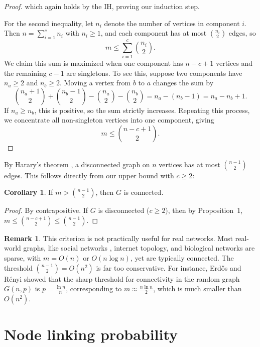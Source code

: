 \documentclass[12pt]{article}
\theoremstyle{definition}
\newtheorem{corollary}[theorem]{Corollary}
\newtheorem{remark}[theorem]{Remark}
\begin{document}
\begin{proof}
  \noindent
  which again holds by the IH, proving our induction step.

  For the second inequality, let $n_i$ denote the number of vertices in component $i$. Then $n = \sum_{i=1}^{c} n_i$ with $n_i \geq 1$, and each component has at most $\binom{n_i}{2}$ edges, so
  \[
    m \leq \sum_{i=1}^{c} \binom{n_i}{2}.
  \]
  We claim this sum is maximized when one component has $n - c + 1$ vertices and the remaining $c - 1$ are singletons. To see this, suppose two components have $n_a \geq 2$ and $n_b \geq 2$. Moving a vertex from $b$ to $a$ changes the sum by
  \[
    \binom{n_a + 1}{2} + \binom{n_b - 1}{2} - \binom{n_a}{2} - \binom{n_b}{2} = n_a - (n_b - 1) = n_a - n_b + 1.
  \]
  If $n_a \geq n_b$, this is positive, so the sum strictly increases. Repeating this process, we concentrate all non-singleton vertices into one component, giving
  \[
    m \leq \binom{n - c + 1}{2}.
  \]

\end{proof}

\noindent
By Harary's theorem \cite{harary1969graph}, a disconnected graph on $n$ vertices has at most $\binom{n-1}{2}$ edges. This follows directly from our upper bound with $c \geq 2$:

\begin{corollary}
  If $m > \binom{n-1}{2}$, then $G$ is connected.
\end{corollary}

\begin{proof}
  By contrapositive. If $G$ is disconnected ($c \geq 2$), then by Proposition~1,
  $m \leq \binom{n - c + 1}{2} \leq \binom{n-1}{2}$.
\end{proof}

\begin{remark}
  This criterion is not practically useful for real networks. Most real-world graphs, like social networks \cite{barabasi1999emergence}, internet topology, and biological networks are sparse, with $m = O(n)$ or $O(n \log n)$, yet are typically connected. The threshold $\binom{n-1}{2} = O(n^2)$ is far too conservative. For instance, Erd\H{o}s and R\'enyi \cite{erdos1959random} showed that the sharp threshold for connectivity in the random graph $G(n,p)$ is $p = \frac{\ln n}{n}$, corresponding to $m \approx \frac{n \ln n}{2}$, which is much smaller than $O(n^2)$.
\end{remark}

\newpage
\section{Node linking probability}
\end{document}
